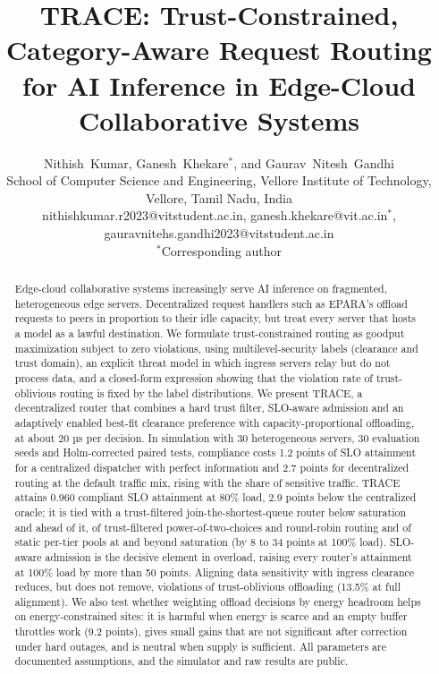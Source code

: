 \documentclass[journal]{IEEEtran}
\begin{document}
\title{TRACE: Trust-Constrained, Category-Aware Request Routing for AI Inference in Edge-Cloud Collaborative Systems}
\author{Nithish~Kumar, Ganesh~Khekare$^{*}$, and Gaurav~Nitesh~Gandhi\\[4pt]
{\normalsize School of Computer Science and Engineering, Vellore Institute of Technology, Vellore, Tamil Nadu, India}\\
{\normalsize nithishkumar.r2023@vitstudent.ac.in, ganesh.khekare@vit.ac.in$^{*}$, gauravnitehs.gandhi2023@vitstudent.ac.in}\\
{\normalsize $^{*}$Corresponding author}}
\maketitle

\begin{abstract}
Edge-cloud collaborative systems increasingly serve AI inference on fragmented, heterogeneous edge servers. Decentralized request handlers such as EPARA's offload requests to peers in proportion to their idle capacity, but treat every server that hosts a model as a lawful destination. We formulate trust-constrained routing as goodput maximization subject to zero violations, using multilevel-security labels (clearance and trust domain), an explicit threat model in which ingress servers relay but do not process data, and a closed-form expression showing that the violation rate of trust-oblivious routing is fixed by the label distributions. We present TRACE, a decentralized router that combines a hard trust filter, SLO-aware admission and an adaptively enabled best-fit clearance preference with capacity-proportional offloading, at about 20 µs per decision. In simulation with 30 heterogeneous servers, 30 evaluation seeds and Holm-corrected paired tests, compliance costs 1.2 points of SLO attainment for a centralized dispatcher with perfect information and 2.7 points for decentralized routing at the default traffic mix, rising with the share of sensitive traffic. TRACE attains 0.960 compliant SLO attainment at 80\% load, 2.9 points below the centralized oracle; it is tied with a trust-filtered join-the-shortest-queue router below saturation and ahead of it, of trust-filtered power-of-two-choices and round-robin routing and of static per-tier pools at and beyond saturation (by 8 to 34 points at 100\% load). SLO-aware admission is the decisive element in overload, raising every router's attainment at 100\% load by more than 50 points. Aligning data sensitivity with ingress clearance reduces, but does not remove, violations of trust-oblivious offloading (13.5\% at full alignment). We also test whether weighting offload decisions by energy headroom helps on energy-constrained sites: it is harmful when energy is scarce and an empty buffer throttles work (9.2 points), gives small gains that are not significant after correction under hard outages, and is neutral when supply is sufficient. All parameters are documented assumptions, and the simulator and raw results are public.
\end{abstract}
\end{document}
